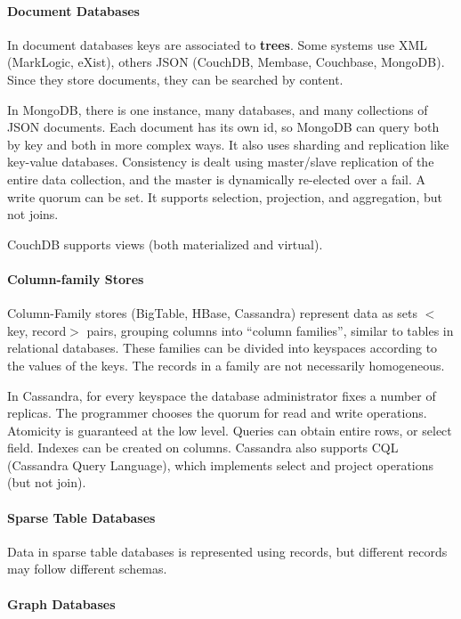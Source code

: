 \paragraph{Document Databases}

In document databases keys are associated to \textbf{trees}. Some systems use XML (MarkLogic, eXist), others JSON (CouchDB, Membase, Couchbase, MongoDB). Since they store documents, they can be searched by content.

In MongoDB, there is one instance, many databases, and many collections of JSON documents. Each document has its own id, so MongoDB can query both by key and both in more complex ways. It also uses sharding and replication like key-value databases. Consistency is dealt using master/slave replication of the entire data collection, and the master is dynamically re-elected over a fail. A write quorum can be set. It supports selection, projection, and aggregation, but not joins.

CouchDB supports views (both materialized and virtual).

\paragraph{Column-family Stores}

Column-Family stores (BigTable, HBase, Cassandra) represent data as sets $<$key, record$>$ pairs, grouping columns into ``column families'', similar to tables in relational databases. These families can be divided into keyspaces according to the values of the keys. The records in a family are not necessarily homogeneous.

In Cassandra, for every keyspace the database administrator fixes a number of replicas. The programmer chooses the quorum for read and write operations. Atomicity is guaranteed at the low level. Queries can obtain entire rows, or select field. Indexes can be created on columns. Cassandra also supports CQL (Cassandra Query Language), which implements select and project operations (but not join).

\paragraph{Sparse Table Databases}

Data in sparse table databases is represented using records, but different records may follow different schemas.

\paragraph{Graph Databases}

